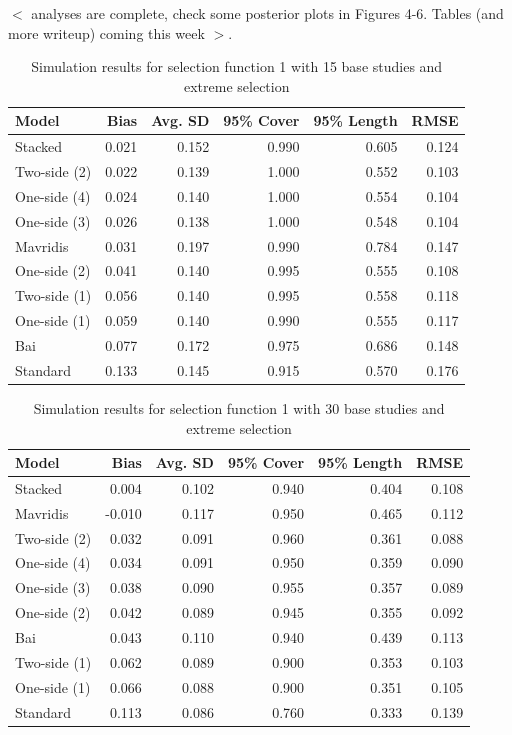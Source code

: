 \documentclass[12pt]{article}   	%
\numberwithin{equation}{section}
\begin{document}
$<$ analyses are complete, check some posterior plots in Figures 4-6. Tables (and more writeup) coming this week $>$.



\begin{table}[ht]
\centering
\begin{tabular}{lrrrrr}
  \hline
Model & Bias & Avg. SD & 95\% Cover & 95\% Length & RMSE \\ 
  \hline
Stacked & 0.021 & 0.152 & 0.990 & 0.605 & 0.124 \\ 
  Two-side (2) & 0.022 & 0.139 & 1.000 & 0.552 & 0.103 \\ 
  One-side (4) & 0.024 & 0.140 & 1.000 & 0.554 & 0.104 \\ 
  One-side (3) & 0.026 & 0.138 & 1.000 & 0.548 & 0.104 \\ 
  Mavridis & 0.031 & 0.197 & 0.990 & 0.784 & 0.147 \\ 
  One-side (2) & 0.041 & 0.140 & 0.995 & 0.555 & 0.108 \\ 
  Two-side (1) & 0.056 & 0.140 & 0.995 & 0.558 & 0.118 \\ 
  One-side (1) & 0.059 & 0.140 & 0.990 & 0.555 & 0.117 \\ 
  Bai & 0.077 & 0.172 & 0.975 & 0.686 & 0.148 \\ 
  Standard & 0.133 & 0.145 & 0.915 & 0.570 & 0.176 \\ 
   \hline
\end{tabular}
\caption{Simulation results for selection function 1 with 15 base studies and extreme selection}
\label{table:sim1_extreme_big_15}
\end{table}

\begin{table}[ht]
\centering
\begin{tabular}{lrrrrr}
  \hline
Model & Bias & Avg. SD & 95\% Cover & 95\% Length & RMSE \\ 
  \hline
Stacked          & 0.004 & 0.102 & 0.940 & 0.404 & 0.108 \\ 
  Mavridis        & -0.010 & 0.117 & 0.950 & 0.465 & 0.112 \\ 
  Two-side (2) & 0.032 & 0.091 & 0.960 & 0.361 & 0.088 \\ 
  One-side (4) & 0.034 & 0.091 & 0.950 & 0.359 & 0.090 \\ 
  One-side (3) & 0.038 & 0.090 & 0.955 & 0.357 & 0.089 \\ 
  One-side (2) & 0.042 & 0.089 & 0.945 & 0.355 & 0.092 \\ 
  Bai 		      & 0.043 & 0.110 & 0.940 & 0.439 & 0.113 \\ 
  Two-side (1) & 0.062 & 0.089 & 0.900 & 0.353 & 0.103 \\ 
  One-side (1) & 0.066 & 0.088 & 0.900 & 0.351 & 0.105 \\ 
  Standard      & 0.113 & 0.086 & 0.760 & 0.333 & 0.139 \\ 
   \hline
\end{tabular}
\caption{Simulation results for selection function 1 with 30 base studies and extreme selection}
\label{table:sim1_extreme_big_30}
\end{table}
\end{document}
